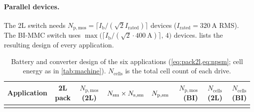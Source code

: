 \paragraph{Parallel devices.} The 2L switch needs $N_\mathrm{p,mos}=\lceil I_\mathrm{b}/(\sqrt2 I_\mathrm{rated})\rceil$ devices ($I_\mathrm{rated}=\SI{320}{\ampere}$ RMS). The BI-MMC switch uses $\max\big(\lceil I_\mathrm{b}/(\sqrt2\cdot\SI{400}{\ampere})\rceil,\,4\big)$ devices.  lists the resulting design of every application.

\begin{table}[ht]
\centering
\caption{Battery and converter design of the six applications (\cref{eq:pack2l,eq:npsm}; cell energy as in \cref{tab:machine}). $N_\mathrm{cells}$ is the total cell count of each drive.}
\label{tab:conv}
\footnotesize
\begin{tabular}{@{}lccccrrr@{}}
\toprule
Application & 2L pack & $N_\mathrm{p,mos}$ (2L) & $N_\mathrm{sm}\times N_\mathrm{s,sm}$ & $N_\mathrm{p,sm}$ & $N_\mathrm{p,mos}$ (BI) & $N_\mathrm{cells}$ (2L) & $N_\mathrm{cells}$ (BI) \\
\midrule
\\
\bottomrule
\end{tabular}
\end{table}

